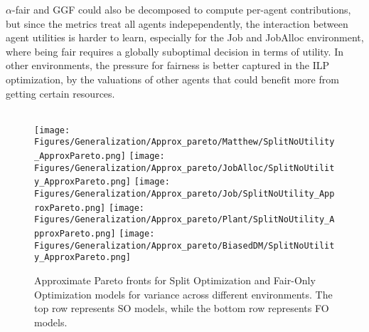 $\alpha$-fair and GGF could also be decomposed to compute per-agent contributions, but since the metrics treat all agents indepependently, the interaction between agent utilities is harder to learn, especially for the Job and JobAlloc environment, where being fair requires a globally suboptimal decision in terms of utility. In other environments, the pressure for fairness is better captured in the ILP optimization, by the valuations of other agents that could benefit more from getting certain resources. 


\begin{figure*}[t]
    \centering
    \\
    \texttt{[image: Figures/Generalization/Approx\_pareto/Matthew/SplitNoUtility\_ApproxPareto.png]}
    \texttt{[image: Figures/Generalization/Approx\_pareto/JobAlloc/SplitNoUtility\_ApproxPareto.png]}
    \texttt{[image: Figures/Generalization/Approx\_pareto/Job/SplitNoUtility\_ApproxPareto.png]}
    \texttt{[image: Figures/Generalization/Approx\_pareto/Plant/SplitNoUtility\_ApproxPareto.png]}
    \texttt{[image: Figures/Generalization/Approx\_pareto/BiasedDM/SplitNoUtility\_ApproxPareto.png]}
    \caption{Approximate Pareto fronts for Split Optimization and Fair-Only Optimization models for variance across different environments. The top row represents SO models, while the bottom row represents FO models.}
    \label{fig:approx_pareto_fronts}
\end{figure*}

